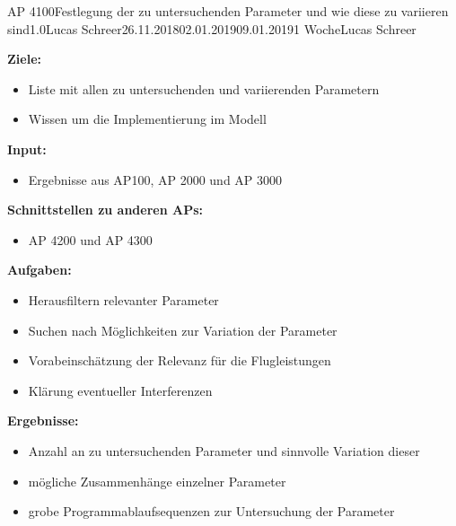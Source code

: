 \begin{appendix}
\clearpage
\begin{wpd}{AP 4100}{Festlegung der zu untersuchenden Parameter und wie diese zu variieren sind}{1.0}{Lucas Schreer}{26.11.2018}{02.01.2019}{09.01.2019}{1 Woche}{Lucas Schreer}
    {
    \textbf{Ziele:}
    \begin{itemize}
        \item Liste mit allen zu untersuchenden und variierenden Parametern
        \item Wissen um die Implementierung im Modell
    \end{itemize}
    \textbf{Input:}
    \begin{itemize}
        \item Ergebnisse aus AP100, AP 2000 und AP 3000
    \end{itemize}
    \textbf{Schnittstellen zu anderen APs:}
    \begin{itemize}
        \item AP 4200 und AP 4300
    \end{itemize}
    \textbf{Aufgaben:}
    \begin{itemize}
        \item Herausfiltern relevanter Parameter
        \item Suchen nach Möglichkeiten zur Variation der Parameter
        \item Vorabeinschätzung der Relevanz für die Flugleistungen
        \item Klärung eventueller Interferenzen
    \end{itemize}
    \textbf{Ergebnisse:}
    \begin{itemize}
        \item Anzahl an zu untersuchenden Parameter und sinnvolle Variation dieser
        \item mögliche Zusammenhänge einzelner Parameter
        \item grobe Programmablaufsequenzen zur Untersuchung der Parameter 
    \end{itemize}
    }
\end{wpd}



\end{appendix}
